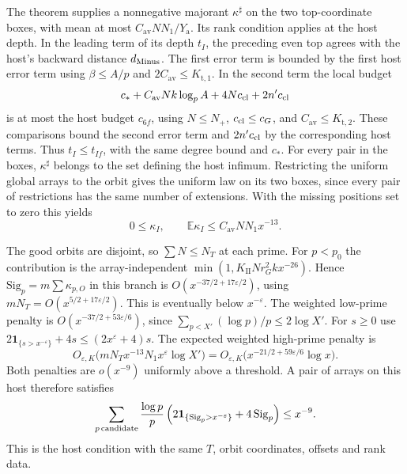 The theorem supplies a nonnegative majorant \(\kappa^\sharp\)
on the two top-coordinate boxes, with mean at most
\(C_{\mathrm{av}}NN_1/Y_{\mathrm a}\). Its rank condition
applies at the host depth. In the leading term of its depth \(t_I\),
the preceding even top agrees with the host's backward distance
\(d_{\rm Minus}\). The first error term is bounded by the first
host error term using \(\beta\le A/p\) and
\(2C_{\mathrm{av}}\le K_{\mathrm{t},1}\).
In the second term the local budget
\[
 c_*+C_{\mathrm{av}}N k\log_p A+4N c_{\rm cl}+2n'c_{\rm cl}
\]
is at most the host budget \(c_{6f}\), using \(N\le N_+\),
\(c_{\rm cl}\le c_G\), and
\(C_{\mathrm{av}}\le K_{\mathrm{t},2}\).
These comparisons bound the second error term and
\(2n'c_{\rm cl}\) by the corresponding host terms. Thus
\(t_I\le t_{If}\), with the same degree bound and \(c_*\).
For every pair in the boxes, \(\kappa^\sharp\) belongs to the
set defining the host infimum. Restricting the uniform global
arrays to the orbit gives the uniform law on its two boxes, since
every pair of restrictions has the same number of extensions.
With the missing positions set to zero this yields
\[
 0\le \kappa_I,\qquad \mathbb E\kappa_I\le C_{\mathrm{av}}NN_1x^{-13}.
\]

The good orbits are disjoint, so \(\sum N\le N_T\) at each
prime. For \(p<p_0\) the contribution is the array-independent
\(\min(1,K_{\mathrm{II}}Nr_G^2 kx^{-26})\).
Hence \(\mathrm{Sig}_p=m\sum\kappa_{p,O}\) in this branch is
\(O(x^{-37/2+17\varepsilon/2})\), using
\(mN_T=O(x^{5/2+17\varepsilon/2})\). This is eventually below
\(x^{-\varepsilon}\). The weighted low-prime penalty is
\(O(x^{-37/2+53\varepsilon/6})\), since
\(\sum_{p<X'}(\log p)/p\le2\log X'\).
For \(s\ge0\) use
\(2\mathbf1_{\{s>x^{-\varepsilon}\}}+4s\le(2x^\varepsilon+4)s\).
The expected weighted high-prime penalty is
\[
 O_{\varepsilon,K}\bigl(
 mN_T x^{-13}N_1 x^\varepsilon\log X'\bigr)
 =O_{\varepsilon,K}\bigl(x^{-21/2+59\varepsilon/6}\log x\bigr).
\]
Both penalties are \(o(x^{-9})\) uniformly above a threshold.
A pair of arrays on this host therefore satisfies
\begin{equation}
\label{eq:classical-array-penalty}
 \sum_{p\,{\rm candidate}}\frac{\log p}{p}
   \left(2\mathbf1_{\{\mathrm{Sig}_p>x^{-\varepsilon}\}}
       +4\,\mathrm{Sig}_p\right)\le x^{-9}.
\end{equation}
This is the host condition with the same \(T\), orbit coordinates,
offsets and rank data.

